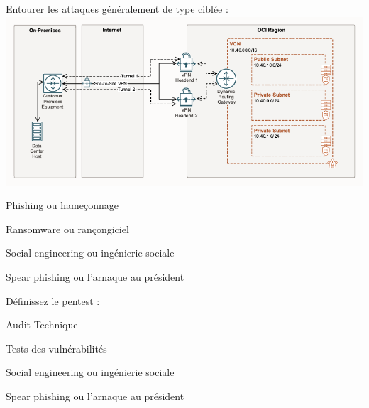 

 	
\begin{multi}[multiple=true]{\QuizzID}
	Entourer les attaques généralement de type  ciblée :\\
	\includegraphics[scale=0.5]{../Latex/Sources/EDU/SRC2/Quizz/pictures/image.png}
	
\item 	Phishing ou hameçonnage
\item 	Ransomware ou rançongiciel
\item* 	Social engineering ou ingénierie sociale
\item* 	Spear phishing ou l'arnaque au président
\end{multi}

\begin{multi}[multiple=true]{\QuizzID}
	Définissez le pentest :
\item*	Audit Technique
\item*	Tests des vulnérabilités
\item 	Social engineering ou ingénierie sociale
\item 	Spear phishing ou l'arnaque au président
\end{multi}
   	
